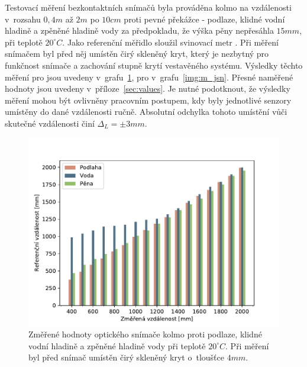         Testovací měření bezkontaktních snímačů byla prováděna kolmo na vzdálenosti v~rozsahu $0,4\unit{m}$ až $2\unit{m}$ po $10\unit{cm}$ proti pevné překážce - podlaze, klidné vodní hladině a zpěněné hladině vody za předpokladu, že výška pěny nepřesáhla $15\unit{mm}$, při teplotě $20^\circ\unit{C}$. Jako referenční měřidlo sloužil svinovací metr . Při měření snímačem  byl před něj umístěn čirý skleněný kryt, který je nezbytný pro funkčnost snímače a zachování stupně krytí vestavěného systému. Výsledky těchto měření pro  jsou uvedeny v~grafu~\ref{img:m_lidar}, pro  v~grafu~\ref{img:m_jsn}. Přesné naměřené hodnoty jsou uvedeny v~příloze~\ref{sec:values}. Je nutné podotknout, že výsledky měření mohou být ovlivněny pracovním postupem, kdy byly jednotlivé senzory umístěny do dané vzdálenosti ručně. Absolutní odchylka tohoto umístění vůči skutečné vzdálenosti činí $\Delta_L =\pm3\unit{mm}$.

        \begin{figure}[h]
            \centering
            \includegraphics[width=\linewidth]{obrazky-figures/lidar_mes.pdf}
            \caption{Změřené hodnoty optického snímače  kolmo proti podlaze, klidné vodní hladině a zpěněné hladině vody při teplotě $20^\circ\unit{C}$. Při měření byl před snímač umístěn čirý skleněný kryt o~tloušťce $4\unit{mm}$.}
            \label{img:m_lidar}
        \end{figure}

